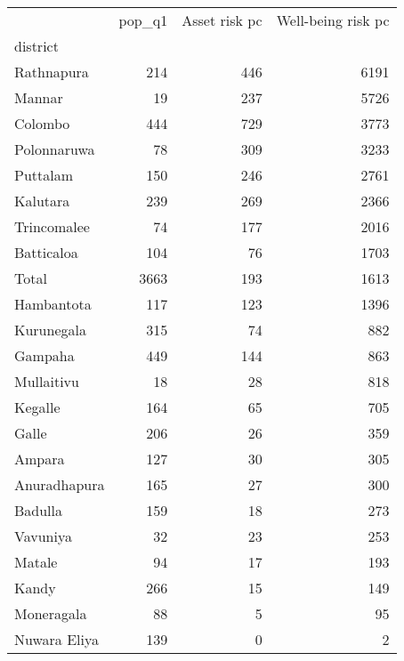 \begin{tabular}{lrrr}
\toprule
{} &  pop\_q1 &  Asset risk pc &  Well-being risk pc \\
district     &         &                &                     \\
\midrule
Rathnapura   &     214 &            446 &                6191 \\
Mannar       &      19 &            237 &                5726 \\
Colombo      &     444 &            729 &                3773 \\
Polonnaruwa  &      78 &            309 &                3233 \\
Puttalam     &     150 &            246 &                2761 \\
Kalutara     &     239 &            269 &                2366 \\
Trincomalee  &      74 &            177 &                2016 \\
Batticaloa   &     104 &             76 &                1703 \\
Total        &    3663 &            193 &                1613 \\
Hambantota   &     117 &            123 &                1396 \\
Kurunegala   &     315 &             74 &                 882 \\
Gampaha      &     449 &            144 &                 863 \\
Mullaitivu   &      18 &             28 &                 818 \\
Kegalle      &     164 &             65 &                 705 \\
Galle        &     206 &             26 &                 359 \\
Ampara       &     127 &             30 &                 305 \\
Anuradhapura &     165 &             27 &                 300 \\
Badulla      &     159 &             18 &                 273 \\
Vavuniya     &      32 &             23 &                 253 \\
Matale       &      94 &             17 &                 193 \\
Kandy        &     266 &             15 &                 149 \\
Moneragala   &      88 &              5 &                  95 \\
Nuwara Eliya &     139 &              0 &                   2 \\
\bottomrule
\end{tabular}
